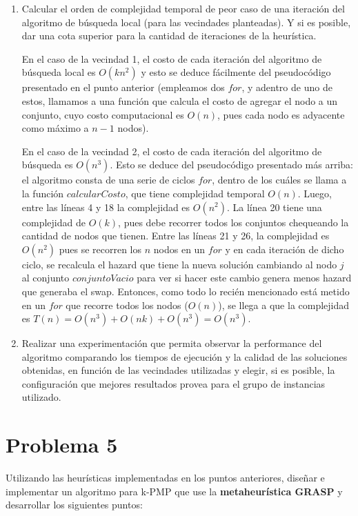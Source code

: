 \documentclass[11pt, a4paper, twoside]{article}
\begin{document}
\begin{enumerate}
		\item Calcular el orden de complejidad temporal de peor caso de una iteración del algoritmo de búsqueda local
			  (para las vecindades planteadas). Y si es posible, dar una cota superior para la cantidad de iteraciones
			  de la heurística. 
			  
			  En el caso de la vecindad 1, el costo de cada iteración del algoritmo de búsqueda local es $O(kn^2)$ y esto
			  se deduce fácilmente del pseudocódigo presentado en el punto anterior (empleamos dos $for$, y adentro de uno
			  de estos, llamamos a una función que calcula el costo de agregar el nodo a un conjunto, cuyo costo computacional
			  es $O(n)$, pues cada nodo es adyacente como máximo a $n-1$ nodos).
			  
			  En el caso de la vecindad 2, el costo de cada iteración del algoritmo de búsqueda es $ O(n^3) $. Esto se deduce
			  del pseudocódigo presentado más arriba: el algoritmo consta de una serie de ciclos $for$, dentro de los
			  cuáles se llama a la función $calcularCosto$, que tiene complejidad temporal $O(n)$. 
			  Luego, entre las líneas 4 y 18 la complejidad es $O(n^2)$. La línea 20 tiene una complejidad de $O(k)$, pues
			  debe recorrer todos los conjuntos chequeando la cantidad de nodos que tienen. Entre las líneas 21 y 26, la 
			  complejidad es $O(n^2)$ pues se recorren los $n$ nodos en un $for$ y en cada iteración de dicho ciclo, se 
			  recalcula el hazard que tiene la nueva solución cambiando al nodo $j$ al conjunto $conjuntoVacio$ para ver si
			  hacer este cambio genera menos hazard que generaba el swap. 
			  Entonces, como todo lo recién mencionado está metido en un $for$ que recorre todos los nodos ($O(n)$), 
			  se llega a que la complejidad es $T(n) = O(n^3) + O(nk) + O(n^3) = O(n^3) $.
			  
	    \item Realizar una experimentación que permita observar la performance del algoritmo comparando los tiempos
			  de ejecución y la calidad de las soluciones obtenidas, en función de las vecindades utilizadas y elegir,
			  si es posible, la configuración que mejores resultados provea para el grupo de instancias utilizado.
    \end{enumerate}




\newpage
\section{Problema 5}
	Utilizando las heurísticas implementadas en los puntos anteriores, diseñar e implementar un algoritmo para k-PMP que
	use la \textbf{metaheurística GRASP} y desarrollar los siguientes puntos:
	
\end{document}
